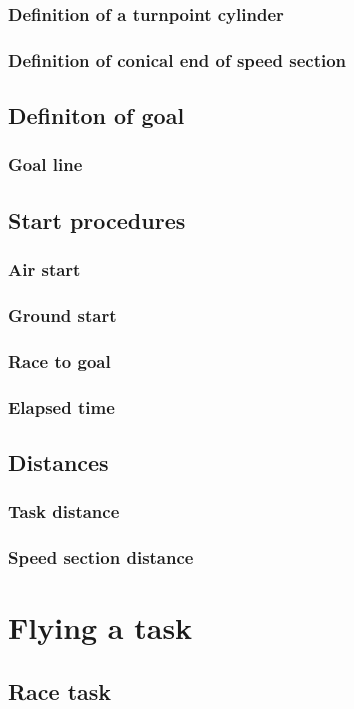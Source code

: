 \documentclass{article}
\begin{document}
\subsubsection{Definition of a turnpoint cylinder}
\subsubsection{Definition of conical end of speed section}
\subsection{Definiton of goal}
\subsubsection{Goal line}
\subsection{Start procedures}
\subsubsection{Air start}
\subsubsection{Ground start}
\subsubsection{Race to goal}
\subsubsection{Elapsed time}
\subsection{Distances}
\subsubsection{Task distance}
\subsubsection{Speed section distance}

\newpage
\section{Flying a task}
\subsection{Race task}
\end{document}
